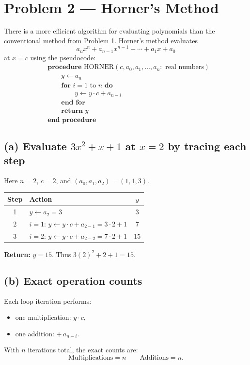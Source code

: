 \section*{Problem 2 — Horner's Method}

There is a more efficient algorithm for evaluating polynomials than the conventional method from Problem 1. Horner's method evaluates
\[
a_n x^{n} + a_{n-1}x^{n-1} + \cdots + a_1 x + a_0
\]
at $x=c$ using the pseudocode:
\[
\begin{aligned}
&\textbf{procedure } \mathrm{HORNER}(c, a_0, a_1, \ldots, a_n : \text{ real numbers})\\
&\qquad y \leftarrow a_n\\
&\qquad \textbf{for } i = 1 \text{ to } n \textbf{ do}\\
&\qquad\qquad y \leftarrow y \cdot c + a_{n-i}\\
&\qquad \textbf{end for}\\
&\qquad \textbf{return } y\\
&\textbf{end procedure}
\end{aligned}
\]

\subsection*{(a) Evaluate $3x^2 + x + 1$ at $x=2$ by tracing each step}
Here $n=2$, $c=2$, and $(a_0,a_1,a_2)=(1,1,3)$.

\begin{center}
\begin{tabular}{c|l|c}
\textbf{Step} & \textbf{Action} & \textbf{$y$} \\
\hline
1 & $y \leftarrow a_2 = 3$ & $3$ \\
\hline
2 & $i=1$: $y \leftarrow y\cdot c + a_{2-1} = 3\cdot 2 + 1$ & $7$ \\
3 & $i=2$: $y \leftarrow y\cdot c + a_{2-2} = 7\cdot 2 + 1$ & $15$ \\
\end{tabular}
\end{center}

\noindent\textbf{Return: } $y=15$. Thus $3(2)^2 + 2 + 1 = 15$.

\subsection*{(b) Exact operation counts}
Each loop iteration performs:
\begin{itemize}
  \item one multiplication: $y \cdot c$,
  \item one addition: $+\, a_{n-i}$.
\end{itemize}
With $n$ iterations total, the exact counts are:
\[
\boxed{\text{Multiplications} = n}
\qquad
\boxed{\text{Additions} = n}.
\]